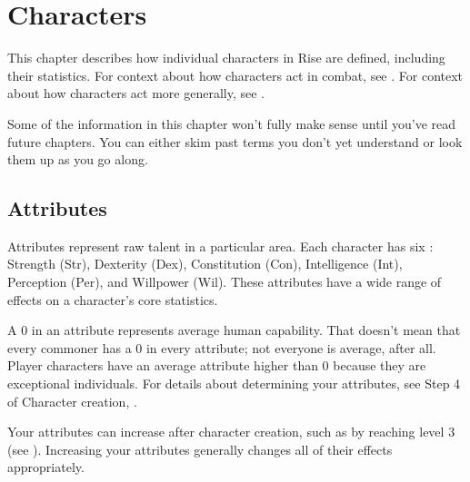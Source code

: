 \chapter{Characters}\label{Characters}

This chapter describes how individual characters in Rise are defined, including their statistics.
For context about how characters act in combat, see .
For context about how characters act more generally, see .

Some of the information in this chapter won't fully make sense until you've read future chapters.
You can either skim past terms you don't yet understand or look them up as you go along.

\section{Attributes}\label{Attributes}

  Attributes represent raw talent in a particular area.
  Each character has six : Strength (Str), Dexterity (Dex), Constitution (Con), Intelligence (Int), Perception (Per), and Willpower (Wil).
  These attributes have a wide range of effects on a character's core statistics.

  A 0 in an attribute represents average human capability.
  That doesn't mean that every commoner has a 0 in every attribute; not everyone is average, after all.
  Player characters have an average attribute higher than 0 because they are exceptional individuals.
  For details about determining your attributes, see Step 4 of Character creation, .

  Your attributes can increase after character creation, such as by reaching level 3 (see ).
  Increasing your attributes generally changes all of their effects appropriately.

